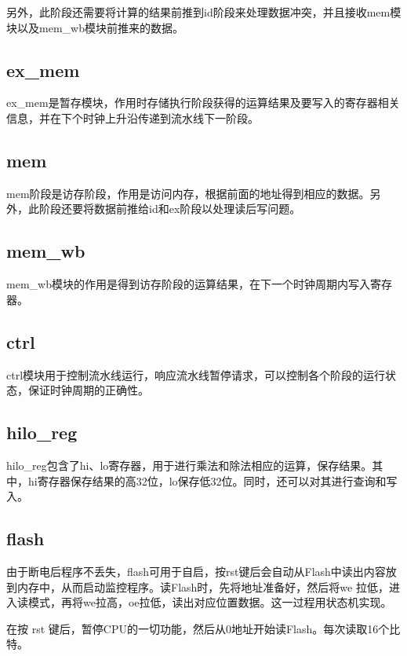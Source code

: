 \documentclass[12pt, utf8, hyperref]{ctexart}
\begin{document}
另外，此阶段还需要将计算的结果前推到id阶段来处理数据冲突，并且接收mem模块以及mem\_wb模块前推来的数据。

\subsection{ex\_mem}
ex\_mem是暂存模块，作用时存储执行阶段获得的运算结果及要写入的寄存器相关信息，并在下个时钟上升沿传递到流水线下一阶段。

\subsection{mem}
mem阶段是访存阶段，作用是访问内存，根据前面的地址得到相应的数据。另外，此阶段还要将数据前推给id和ex阶段以处理读后写问题。

\subsection{mem\_wb}
mem\_wb模块的作用是得到访存阶段的运算结果，在下一个时钟周期内写入寄存器。

\subsection{ctrl}
ctrl模块用于控制流水线运行，响应流水线暂停请求，可以控制各个阶段的运行状态，保证时钟周期的正确性。

\subsection{hilo\_reg}
hilo\_reg包含了hi、lo寄存器，用于进行乘法和除法相应的运算，保存结果。其中，hi寄存器保存结果的高32位，lo保存低32位。同时，还可以对其进行查询和写入。

\subsection{flash}
由于断电后程序不丢失，flash可用于自启，按rst键后会自动从Flash中读出内容放到内存中，从而启动监控程序。读Flash时，先将地址准备好，然后将we 拉低，进入读模式，再将we拉高，oe拉低，读出对应位置数据。这一过程用状态机实现。

在按 rst 键后，暂停CPU的一切功能，然后从0地址开始读Flash。每次读取16个比特。
\end{document}

